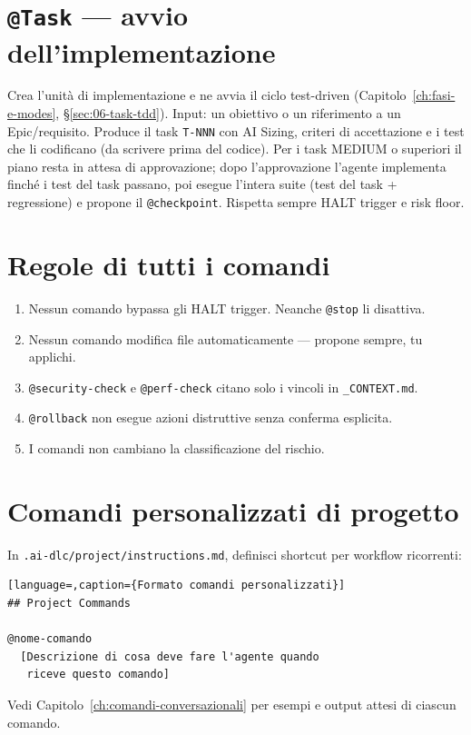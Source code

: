 \section*{\texttt{@Task} --- avvio dell'implementazione}

Crea l'unità di implementazione e ne avvia il ciclo test-driven (Capitolo~\ref{ch:fasi-e-modes}, §\ref{sec:06-task-tdd}). Input: un obiettivo o un riferimento a un Epic/requisito. Produce il task \texttt{T-NNN} con AI Sizing, criteri di accettazione e i test che li codificano (da scrivere prima del codice). Per i task MEDIUM o superiori il piano resta in attesa di approvazione; dopo l'approvazione l'agente implementa finché i test del task passano, poi esegue l'intera suite (test del task + regressione) e propone il \texttt{@checkpoint}. Rispetta sempre HALT trigger e risk floor.

\section*{Regole di tutti i comandi}

\begin{enumerate}
  \item Nessun comando bypassa gli HALT trigger. Neanche \texttt{@stop} li disattiva.
  \item Nessun comando modifica file automaticamente --- propone sempre, tu applichi.
  \item \texttt{@security-check} e \texttt{@perf-check} citano solo i vincoli in \texttt{\_CONTEXT.md}.
  \item \texttt{@rollback} non esegue azioni distruttive senza conferma esplicita.
  \item I comandi non cambiano la classificazione del rischio.
\end{enumerate}

\section*{Comandi personalizzati di progetto}

In \texttt{.ai-dlc/project/instructions.md}, definisci shortcut per workflow ricorrenti:

\begin{lstlisting}[language=,caption={Formato comandi personalizzati}]
## Project Commands

@nome-comando
  [Descrizione di cosa deve fare l'agente quando
   riceve questo comando]
\end{lstlisting}

Vedi Capitolo~\ref{ch:comandi-conversazionali} per esempi e output attesi di ciascun comando.
